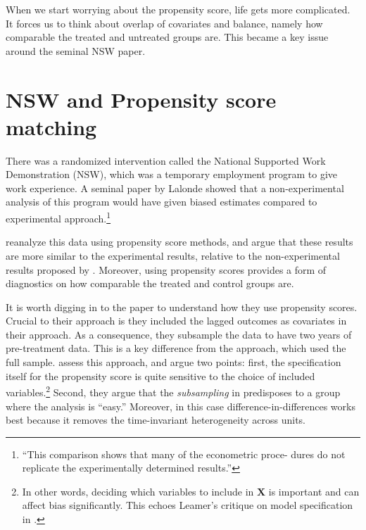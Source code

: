 \documentclass{tufte-handout}
\theoremstyle{break}
\newcommand{\bX}{\mathbf{X}}
\begin{document}
When we start worrying about the propensity score, life gets more complicated. It forces us to think about overlap of covariates and balance, namely how comparable the treated and untreated groups are. This became a key issue around the seminal NSW paper. 

\section{NSW and Propensity score matching}

There was a randomized intervention called the National Supported Work Demonstration (NSW), which was a temporary employment program to give work experience. A seminal paper by Lalonde \citep{lalonde1986evaluating} showed that a non-experimental analysis of this program  would have given biased estimates compared to experimental approach.\footnote{``This comparison shows that many of the econometric proce-
 dures do not replicate the experimentally determined results.''}


\citet{dehejia2002propensity,dehejia1999causal} reanalyze this data using propensity score methods, and argue that these results are more similar to the experimental results, relative to the non-experimental results proposed by \citet{lalonde1986evaluating}. Moreover, using propensity scores provides a form of diagnostics on how comparable the treated and control groups are.

It is worth digging in to the \citet{dehejia2002propensity} paper to understand how they use propensity scores. Crucial to their approach is they included the lagged outcomes as covariates in their approach. As a consequence, they  subsample the data to have two years of pre-treatment data. This is a key difference from the \citet{lalonde1986evaluating} approach, which used the full sample. \citet{smith2005does} assess this approach, and argue two points: first, the specification itself for the propensity score is quite sensitive to the choice of included variables.\footnote{In other words, deciding which variables to include in $\bX$ is important and can affect bias significantly. This echoes Leamer's critique on model specification in \citet{leamer1983let}.} Second, they argue that the \emph{subsampling} in \citet{dehejia2002propensity} predisposes to a group where the analysis is ``easy.'' Moreover, in this case difference-in-differences works best because it removes the time-invariant heterogeneity across units.
\end{document}
